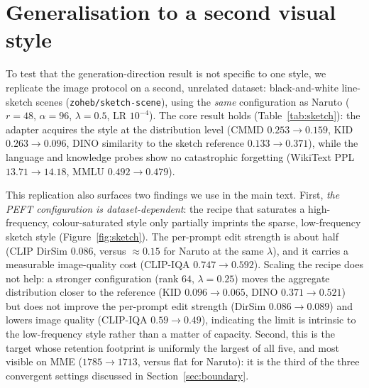 \documentclass{article}
\begin{document}
\section{Generalisation to a second visual style}
\label{app:sketch}
To test that the generation-direction result is not specific to one style, we
replicate the image protocol on a second, unrelated dataset: black-and-white
line-sketch scenes (\texttt{zoheb/sketch-scene}), using the \emph{same}
configuration as Naruto ($r{=}48$, $\alpha{=}96$, $\lambda{=}0.5$, LR
$10^{-4}$). The core result holds (Table~\ref{tab:sketch}): the adapter acquires
the style at the distribution level (CMMD $0.253\!\to\!0.159$, KID
$0.263\!\to\!0.096$, DINO similarity to the sketch reference
$0.133\!\to\!0.371$), while the language and knowledge probes show no
catastrophic forgetting (WikiText PPL $13.71\!\to\!14.18$, MMLU
$0.492\!\to\!0.479$).

This replication also surfaces two findings we use in the main text. First,
\emph{the PEFT configuration is dataset-dependent}: the recipe that saturates a
high-frequency, colour-saturated style only partially imprints the sparse,
low-frequency sketch style (Figure~\ref{fig:sketch}). The per-prompt edit
strength is about half (CLIP DirSim $0.086$, versus $\approx\!0.15$ for Naruto at
the same $\lambda$), and it carries a measurable image-quality cost (CLIP-IQA
$0.747\!\to\!0.592$). Scaling the recipe does not help: a stronger configuration
(rank $64$, $\lambda{=}0.25$) moves the aggregate distribution closer to the
reference (KID $0.096\!\to\!0.065$, DINO $0.371\!\to\!0.521$) but does not
improve the per-prompt edit strength (DirSim $0.086\!\to\!0.089$) and lowers
image quality (CLIP-IQA $0.59\!\to\!0.49$), indicating the limit is intrinsic to
the low-frequency style rather than a matter of capacity. Second, this is the
target whose retention footprint is uniformly the largest of all five, and most
visible on MME ($1785\!\to\!1713$, versus flat for Naruto): it is the third of
the three convergent settings discussed in Section~\ref{sec:boundary}.
\end{document}
